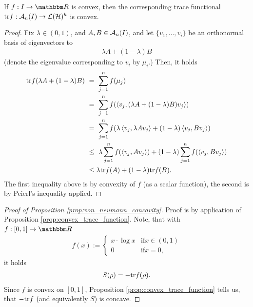  \begin{proposition}\label{prop:convex_trace_function}
  If $f: I \rightarrow \bbmR$ is convex, then the corresponding trace functional $\mathrm{tr} f: {\mathcal A}_n(I) \rightarrow {\mathcal L}({\mathcal H})^h$ 
  is convex. 
 \end{proposition}
 \begin{proof}
  Fix $\lambda \in (0,1)$, and $A, B \in {\mathcal A}_n(I)$, and let $\{v_1,\dots, v_i\}$ be an orthonormal basis of eigenvectors to 
  \begin{align}
   \lambda A + (1 - \lambda) B
  \end{align}
  (denote the eigenvalue corresponding to $v_i$ by $\mu_i$.) Then, it holds
  \begin{align}
   \tr f(\lambda A + (1 - \lambda) B) \ 
   & = \ \sum_{j=1}^n f(\mu_j) \\
   & = \ \sum_{j=1}^n f(\braket{v_j, (\lambda A + (1 - \lambda) B ) v_j}) \\
   & = \ \sum_{j=1}^n f(\lambda \braket{v_j, \lambda A v_j}  + (1 - \lambda) \braket{v_j, B  v_j}) \\
   & \leq \ \lambda \sum_{j=1}^n f(\braket{v_j, A v_j})  +  (1 - \lambda)\sum_{j=1}^n f(\braket{v_j, B  v_j}) \\
   & \leq  \lambda \tr f(A) + (1 - \lambda)  \tr f(B).
  \end{align}
  The first inequality above is by convexity of $f$ (as a scalar function), the second is by Peierl's inequality 
  applied. 
  \end{proof}
  
  \begin{proof}[Proof of Proposition \ref{prop:von_neumann_concavity}]
   Proof is by application of Proposition \ref{prop:convex_trace_function}. Note, that with $f: [0,1] \rightarrow \bbmR$
   \begin{align}
    f(x) := \begin{cases}
             x \cdot \log x & \text{if} x \in (0,1) \\
             0              & \text{if} x = 0,
            \end{cases}
   \end{align}
   it holds
   \begin{align}
    S(\rho) =  - \mathrm{tr} f(\rho). \label{function_f_defined}
   \end{align}
   Since $f$ is convex on $[0,1]$, Proposition \ref{prop:convex_trace_function} tells us, that $-\mathrm{tr} f$ (and equivalently
   $S$) is concave.
  \end{proof}

